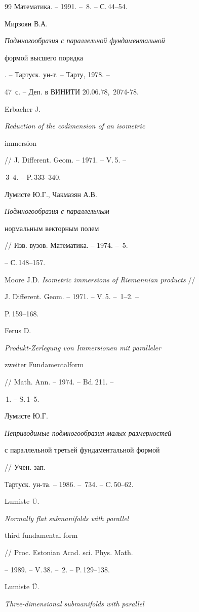 \begin{thebibliography}{99}
Математика. -- 1991. -- \No\,8. -- С.\,44--54.




Мирзоян В.А. {\em Подмногообразия с параллельной фундаментальной


формой высшего порядка}. -- Тартуск. ун-т. -- Тарту, 1978. --


47~с. -- Деп. в ВИНИТИ 20.06.78, \No\,2074-78.




Erbacher J. {\em Reduction of the codimension of an isometric


immersion} // J. Different. Geom. -- 1971. -- V.\,5. --


\No\,3--4. -- P.\,333--340.




Лумисте Ю.Г., Чакмазян А.В. {\em Подмногообразия с параллельным


нормальным векторным полем} // Изв. вузов. Математика. -- 1974. -- \No\,5.


-- С.\,148--157.




Moore J.D. {\em Isometric immersions of Riemannian products} //


J. Different. Geom. -- 1971. -- V.\,5. -- \No\,1--2. --


P.\,159--168.




Ferus D. {\em Produkt-Zerlegung von Immersionen mit paralleler


zweiter Fundamentalform} // Math. Ann. -- 1974. -- Bd.\,211. --


\No\,1. -- S.\,1--5.




Лумисте Ю.Г. {\em Неприводимые подмногообразия малых размерностей


с параллельной третьей фундаментальной формой} // Учен. зап.


Тартуск. ун-та. -- 1986. -- \No\,734. -- C.\,50--62.




Lumiste \"U. {\em Normally flat submanifolds with parallel


third fundamental form} // Proc. Estonian Acad. sci. Phys. Math.


-- 1989. -- V.\,38. -- \No\,2. -- P.\,129--138.




Lumiste \"U. {\em Three-dimensional submanifolds with parallel


}
\end{thebibliography}
